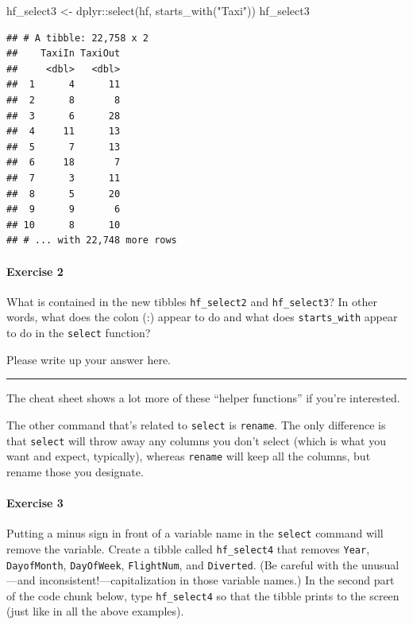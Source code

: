 \documentclass[
]{book}
\newenvironment{Shaded}{\begin{snugshade}}{\end{snugshade}}
\newcommand{\FunctionTok}[1]{\textcolor[rgb]{0.00,0.00,0.00}{#1}}
\newcommand{\NormalTok}[1]{#1}
\newcommand{\OtherTok}[1]{\textcolor[rgb]{0.56,0.35,0.01}{#1}}
\newcommand{\SpecialCharTok}[1]{\textcolor[rgb]{0.00,0.00,0.00}{#1}}
\newcommand{\StringTok}[1]{\textcolor[rgb]{0.31,0.60,0.02}{#1}}
\begin{document}
\begin{Shaded}
\begin{Highlighting}[]
\NormalTok{hf\_select3 }\OtherTok{\textless{}{-}}\NormalTok{ dplyr}\SpecialCharTok{::}\FunctionTok{select}\NormalTok{(hf, }\FunctionTok{starts\_with}\NormalTok{(}\StringTok{"Taxi"}\NormalTok{))}
\NormalTok{hf\_select3}
\end{Highlighting}
\end{Shaded}

\begin{verbatim}
## # A tibble: 22,758 x 2
##    TaxiIn TaxiOut
##     <dbl>   <dbl>
##  1      4      11
##  2      8       8
##  3      6      28
##  4     11      13
##  5      7      13
##  6     18       7
##  7      3      11
##  8      5      20
##  9      9       6
## 10      8      10
## # ... with 22,748 more rows
\end{verbatim}

\hypertarget{exercise-2-1}{%
\paragraph*{Exercise 2}\label{exercise-2-1}}

What is contained in the new tibbles \texttt{hf\_select2} and \texttt{hf\_select3}? In other words, what does the colon (:) appear to do and what does \texttt{starts\_with} appear to do in the \texttt{select} function?

Please write up your answer here.

\begin{center}\rule{0.5\linewidth}{0.5pt}\end{center}

The cheat sheet shows a lot more of these ``helper functions'' if you're interested.

The other command that's related to \texttt{select} is \texttt{rename}. The only difference is that \texttt{select} will throw away any columns you don't select (which is what you want and expect, typically), whereas \texttt{rename} will keep all the columns, but rename those you designate.

\hypertarget{exercise-3-1}{%
\paragraph*{Exercise 3}\label{exercise-3-1}}

Putting a minus sign in front of a variable name in the \texttt{select} command will remove the variable. Create a tibble called \texttt{hf\_select4} that removes \texttt{Year}, \texttt{DayofMonth}, \texttt{DayOfWeek}, \texttt{FlightNum}, and \texttt{Diverted}. (Be careful with the unusual---and inconsistent!---capitalization in those variable names.) In the second part of the code chunk below, type \texttt{hf\_select4} so that the tibble prints to the screen (just like in all the above examples).
\end{document}

